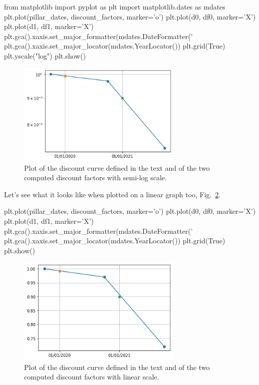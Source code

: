 \begin{ipython}
from matplotlib import pyplot as plt
import matplotlib.dates as mdates
plt.plot(pillar_dates, discount_factors, marker='o')
plt.plot(d0, df0, marker='X')
plt.plot(d1, df1, marker='X')
plt.gca().xaxis.set_major_formatter(mdates.DateFormatter('%
plt.gca().xaxis.set_major_locator(mdates.YearLocator())
plt.grid(True)
plt.yscale("log")
plt.show()
\end{ipython}

\begin{figure}[htb]
	\centering
	\includegraphics[width=0.7\textwidth]{figures/log_discount_curve}
	\caption{Plot of the discount curve defined in the text and of the two computed discount factors with semi-log scale.}
	\label{fig:log_discount_curve}
\end{figure}
\noindent
Let's see what it looks like when plotted on a linear graph too, Fig.~\ref{fig:linear_discount_curve}.
\begin{ipython}
plt.plot(pillar_dates, discount_factors, marker='o')
plt.plot(d0, df0, marker='X')
plt.plot(d1, df1, marker='X')
plt.gca().xaxis.set_major_formatter(mdates.DateFormatter('%
plt.gca().xaxis.set_major_locator(mdates.YearLocator())
plt.grid(True)
plt.show()
\end{ipython}

\begin{figure}[htb]
	\centering
	\includegraphics[width=0.7\textwidth]{figures/linear_discount_curve}
	\caption{Plot of the discount curve defined in the text and of the two computed
		discount factors with linear scale.}
	\label{fig:linear_discount_curve}
\end{figure}

